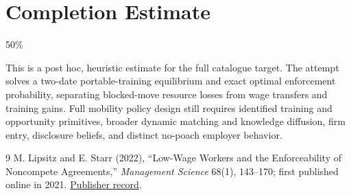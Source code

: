 \documentclass[11pt]{article}
\theoremstyle{definition}
\begin{document}
\section{Completion Estimate}
50\%

This is a post hoc, heuristic estimate for the full catalogue target.
The attempt solves a two-date portable-training equilibrium and exact optimal enforcement probability, separating blocked-move resource losses from wage transfers and training gains. Full mobility policy design still requires identified training and opportunity primitives, broader dynamic matching and knowledge diffusion, firm entry, disclosure beliefs, and distinct no-poach employer behavior.

\begin{thebibliography}{9}
 M. Lipsitz and E. Starr (2022), ``Low-Wage Workers and the Enforceability of Noncompete Agreements,'' \emph{Management Science} 68(1), 143--170; first published online in 2021. \href{https://doi.org/10.1287/mnsc.2020.3918}{Publisher record}.
\end{thebibliography}
\end{document}
